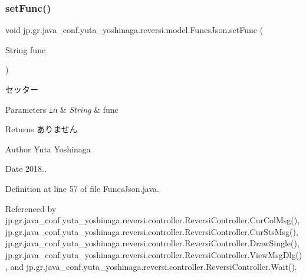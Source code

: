 \subsubsection{\texorpdfstring{set\+Func()}{setFunc()}}
{\footnotesize\ttfamily void jp.\+gr.\+java\+\_\+conf.\+yuta\+\_\+yoshinaga.\+reversi.\+model.\+Funcs\+Json.\+set\+Func (\begin{DoxyParamCaption}\item[{String}]{func }\end{DoxyParamCaption})}



セッター 


\begin{DoxyParams}[1]{Parameters}
\mbox{\tt in}  & {\em String} & func \\
\hline
\end{DoxyParams}
\begin{DoxyReturn}{Returns}
ありません 
\end{DoxyReturn}
\begin{DoxyAuthor}{Author}
Yuta Yoshinaga 
\end{DoxyAuthor}
\begin{DoxyDate}{Date}
2018.. 
\end{DoxyDate}


Definition at line 57 of file Funcs\+Json.\+java.



Referenced by jp.\+gr.\+java\+\_\+conf.\+yuta\+\_\+yoshinaga.\+reversi.\+controller.\+Reversi\+Controller.\+Cur\+Col\+Msg(), jp.\+gr.\+java\+\_\+conf.\+yuta\+\_\+yoshinaga.\+reversi.\+controller.\+Reversi\+Controller.\+Cur\+Sts\+Msg(), jp.\+gr.\+java\+\_\+conf.\+yuta\+\_\+yoshinaga.\+reversi.\+controller.\+Reversi\+Controller.\+Draw\+Single(), jp.\+gr.\+java\+\_\+conf.\+yuta\+\_\+yoshinaga.\+reversi.\+controller.\+Reversi\+Controller.\+View\+Msg\+Dlg(), and jp.\+gr.\+java\+\_\+conf.\+yuta\+\_\+yoshinaga.\+reversi.\+controller.\+Reversi\+Controller.\+Wait().

